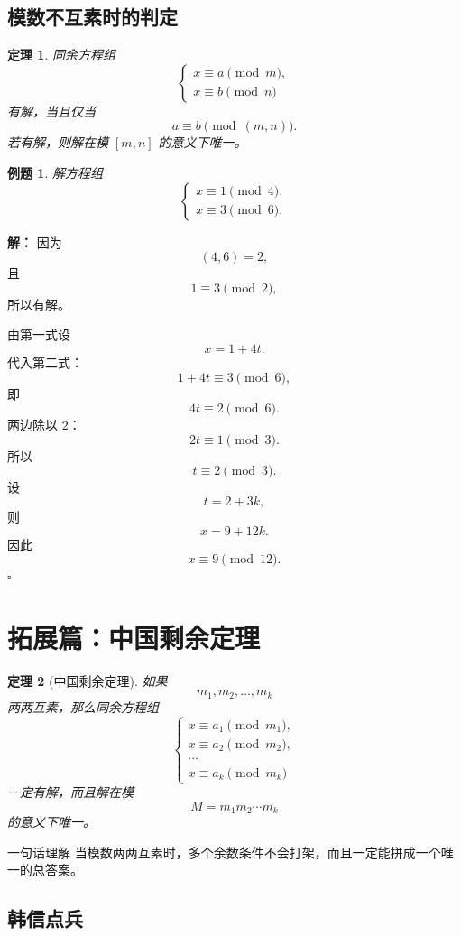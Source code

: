 \documentclass[11pt,a4paper,fontset=fandol]{ctexart}
\theoremstyle{formaltheorem}
\newtheorem{theorem}{定理}[section]
\theoremstyle{formalexample}
\newtheorem{example}{例题}[section]
\newenvironment{solution}{\par\noindent\textbf{解：}}{\hfill$\square$\par}
\begin{document}
\subsection{模数不互素时的判定}

\begin{theorem}
同余方程组
\[
\begin{cases}
x\equiv a\pmod m,\\
x\equiv b\pmod n
\end{cases}
\]
有解，当且仅当
\[
a\equiv b\pmod{(m,n)}.
\]
若有解，则解在模 $[m,n]$ 的意义下唯一。
\end{theorem}

\begin{example}
解方程组
\[
\begin{cases}
x\equiv 1\pmod 4,\\
x\equiv 3\pmod 6.
\end{cases}
\]
\end{example}

\begin{solution}
因为
\[
(4,6)=2,
\]
且
\[
1\equiv 3\pmod 2,
\]
所以有解。

由第一式设
\[
x=1+4t.
\]
代入第二式：
\[
1+4t\equiv 3\pmod 6,
\]
即
\[
4t\equiv 2\pmod 6.
\]
两边除以 $2$：
\[
2t\equiv 1\pmod 3.
\]
所以
\[
t\equiv 2\pmod 3.
\]
设
\[
t=2+3k,
\]
则
\[
x=9+12k.
\]
因此
\[
\boxed{x\equiv 9\pmod{12}}.
\]
\end{solution}

\section{拓展篇：中国剩余定理}

\begin{theorem}[中国剩余定理]
如果
\[
m_1,m_2,\dots,m_k
\]
两两互素，那么同余方程组
\[
\begin{cases}
x\equiv a_1\pmod{m_1},\\
x\equiv a_2\pmod{m_2},\\
\cdots\\
x\equiv a_k\pmod{m_k}
\end{cases}
\]
一定有解，而且解在模
\[
M=m_1m_2\cdots m_k
\]
的意义下唯一。
\end{theorem}

\begin{goalbox}{一句话理解}
当模数两两互素时，多个余数条件不会打架，而且一定能拼成一个唯一的总答案。
\end{goalbox}

\subsection{韩信点兵}
\end{document}
